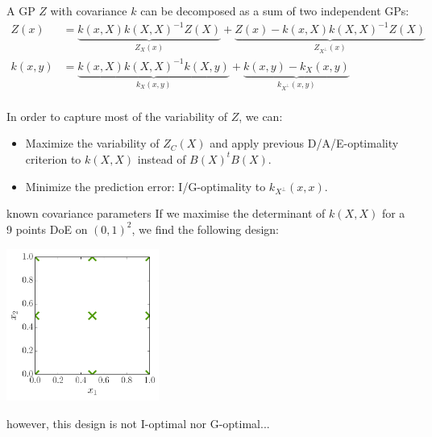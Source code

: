 \begin{frame}{}
A GP $Z$ with covariance $k$ can be decomposed as a sum of two independent GPs:
\begin{equation*}
	\begin{split}
	Z(x) & = \underbrace{k(x,X)k(X,X)^{-1}Z(X)}_{Z_X(x)} + \underbrace{Z(x) - k(x,X)k(X,X)^{-1}Z(X)}_{Z_{X^\perp}(x)}\\
	k(x,y) &= \underbrace{k(x,X)k(X,X)^{-1}k(X,y)}_{k_X(x,y)} + \underbrace{k(x,y) - k_X(x,y)}_{k_{X^\perp}(x,y)}
	\end{split}
\end{equation*}
\ \\
In order to capture most of the variability of $Z$, we can:
\begin{itemize}
	\item Maximize the variability of $Z_C(X)$ and apply previous D/A/E-optimality criterion to $k(X,X)$ instead of $B(X)^tB(X)$.
	\item Minimize the prediction error: I/G-optimality to $k_{X^\perp}(x,x)$.
\end{itemize}
\end{frame}

\begin{frame}{known covariance parameters}
If we maximise the determinant of $k(X,X)$ for a 9 points DoE on $(0,1)^2$, we find the following design:
\begin{center}
\includegraphics[height=5cm]{2_Design_of_experiments/figures/python/opt_XD}
\end{center}
however, this design is not I-optimal nor G-optimal...
\end{frame}

